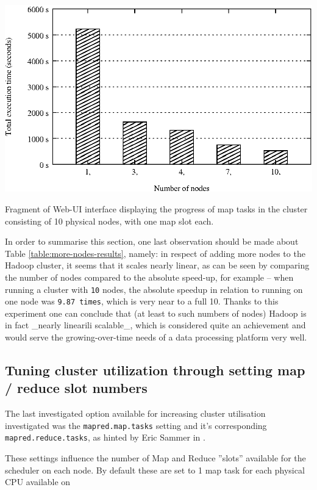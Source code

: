 \begin{table}[ch!]
  \centering
  \includegraphics[width=\textwidth]{img/hadoop/nodes-perf.eps}
  \label{fig:nodes-pers-graph}
  \caption{Fragment of Web-UI interface displaying the progress of map tasks in the cluster consisting of 10 physical nodes, with one map slot each.}
\end{table}

In order to summarise this section, one last observation should be made about Table \ref{table:more-nodes-results}, namely: in respect of adding more nodes to the Hadoop cluster, it seems that it scales nearly linear, as can be seen by comparing the number of nodes compared to the absolute speed-up, for example -- when running a cluster with \verb|10| nodes, the absolute speedup in relation to running on one node was \verb|9.87 times|, which is very near to a full 10. Thanks to this experiment one can conclude that (at least to such numbers of nodes) Hadoop is in fact _nearly linearili scalable_, which is considered quite an achievement and would serve the growing-over-time needs of a data processing platform very well.

\subsection{Tuning cluster utilization through setting map / reduce slot numbers}
The last investigated option available for increasing cluster utilisation investigated was the \verb|mapred.map.tasks| setting and it's corresponding \verb|mapred.reduce.tasks|, as hinted by Eric Sammer in \cite{hadoop-ops}.

These settings influence the number of Map and Reduce ''slots'' available for the scheduler on each node. By default these are set to 1 map task for each physical CPU available on 

